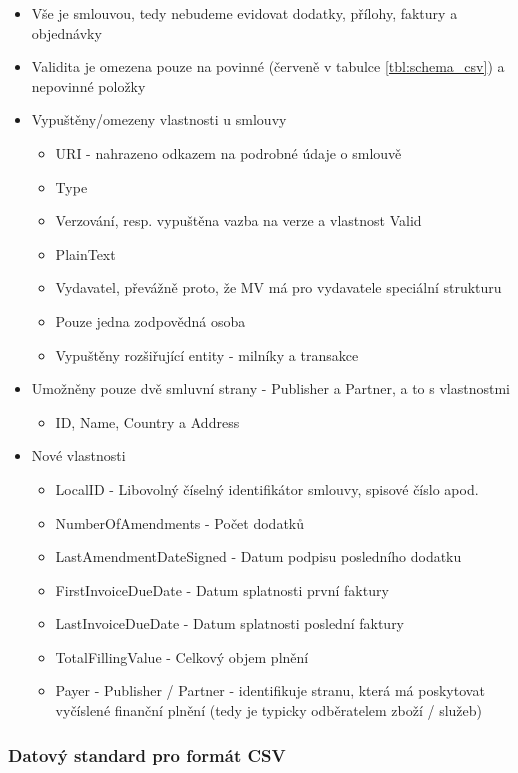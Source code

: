 \begin{itemize}
\item Vše je smlouvou, tedy nebudeme evidovat dodatky, přílohy, faktury a objednávky
\item Validita je omezena pouze na povinné (červeně v tabulce  \ref{tbl:schema_csv}) a nepovinné položky
\item Vypuštěny/omezeny vlastnosti u smlouvy
	\begin{itemize}
	\item URI - nahrazeno odkazem na podrobné údaje o smlouvě
	\item Type
	\item Verzování, resp. vypuštěna vazba na verze a vlastnost Valid
	\item PlainText
	\item Vydavatel, převážně proto, že MV má pro vydavatele speciální strukturu
	\item Pouze jedna zodpovědná osoba
	\item Vypuštěny rozšiřující entity - milníky a transakce
	\end{itemize}
\item Umožněny pouze dvě  smluvní strany - Publisher a Partner, a to s vlastnostmi
	\begin{itemize}
	\item ID, Name, Country a Address
	\end{itemize}
\item Nové vlastnosti
	\begin{itemize}
	\item LocalID - Libovolný číselný identifikátor smlouvy, spisové číslo apod.
	\item NumberOfAmendments - Počet dodatků
	\item LastAmendmentDateSigned - Datum podpisu posledního dodatku 
	\item FirstInvoiceDueDate - Datum splatnosti první faktury 
	\item LastInvoiceDueDate - Datum splatnosti poslední faktury 
	\item TotalFillingValue - Celkový objem plnění
	\item Payer - Publisher / Partner - identifikuje stranu, která má poskytovat vyčíslené finanční plnění (tedy je typicky odběratelem zboží / služeb)
	\end{itemize}
\end{itemize}

\newpage

\subsubsection*{Datový standard pro formát CSV}

